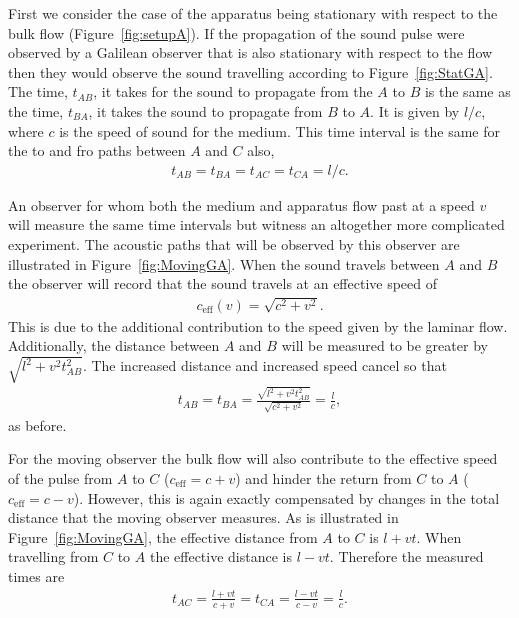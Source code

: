 \documentclass[10pt, fleqn,final,showtrims,oldfontcommands]{article} %
\newcommand{\figref}[1]{Figure~\ref{fig:#1}}
\newcommand{\eff}{{\textrm{eff}}}
\begin{document}
First we consider the case of the apparatus being stationary with respect to the bulk flow (\figref{setupA}).
If the propagation of the sound pulse were observed by a Galilean observer that is also stationary with respect to the flow
then they would observe the sound travelling according to \figref{StatGA}.
The time, $t_{AB}$, it takes for the sound to propagate from the $A$ to $B$ is the same as the time, $t_{BA}$, it takes the sound to propagate from $B$ to $A$.
It is given by $l/c$, where  $c$ is the speed of sound for the medium.
This time interval is the same for the to and fro paths between $A$ and $C$ also,
\begin{align}
  t_{AB}=t_{BA}=t_{AC}=t_{CA}=l/c\label{eqn:setupA:stationary:Tab}.
\end{align}

An observer for whom  both the medium and apparatus flow past at a speed $v$ will measure the same time intervals 
but witness an altogether more complicated experiment.
The acoustic paths that will be observed by this observer are illustrated in \figref{MovingGA}.
When the sound travels between $A$ and $B$ the observer will record that the sound travels at an effective speed of
\begin{align}
\label{eqn:ceffone}
c_\eff(v) = \sqrt{c^2 +v^2}.
\end{align}
This is due to the additional contribution to the speed given by the  laminar flow.
Additionally, the distance between $A$ and $B$ will be measured to be greater by  $\sqrt{l^2+v^2t_{AB}^2}$.
The increased distance and increased speed cancel so that 
\begin{align}
  \label{eqn:setupA:moving:Tab}
  t_{AB} = t_{BA} = \frac{\sqrt{l^2+v^2t_{AB}^2}}{\sqrt{c^2 +v^2}} = \frac{l}{c},
\end{align}
as before.

For the moving observer the bulk flow will also contribute to the effective speed of the pulse from $A$ to $C$  ($c_\eff = c+v$) 
and hinder  the return from $C$ to $A$ ($c_\eff = c-v$).
However, this is again exactly compensated by changes in the total distance that the moving observer measures.
As is illustrated in \figref{MovingGA}, the effective distance from $A$ to $C$ is $l+vt$. %
When travelling from $C$ to $A$ the effective distance is $l-vt$. %
%
Therefore the measured times are
\begin{align}
  \label{eqn:setupA:moving:Tac}
  t_{AC} =  \frac{l+vt}{c+v}= t_{CA} =  \frac{l-vt}{c-v}= \frac{l}{c}.
\end{align}
\end{document}
